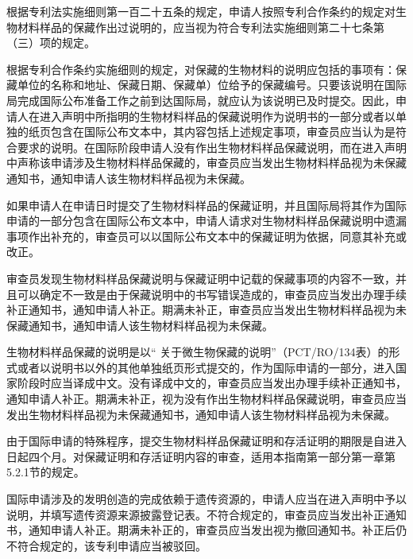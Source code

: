 根据专利法实施细则第一百二十五条的规定，申请人按照专利合作条约的规定对生物材料样品的保藏作出过说明的，应当视为符合专利法实施细则第二十七条第（三）项的规定。

根据专利合作条约实施细则的规定，对保藏的生物材料的说明应包括的事项有：保藏单位的名称和地址、保藏日期、保藏单{\kaiti ）}位给予的保藏编号。只要该说明在国际局完成国际公布准备工作之前到达国际局，就应认为该说明已及时提交。因此，申请人在进入声明中所指明的生物材料样品的保藏说明作为说明书的一部分或者以单独的纸页包含在国际公布文本中，其内容包括上述规定事项，审查员应当认为是符合要求的说明。在国际阶段申请人没有作出生物材料样品保藏说明，而在进入声明中声称该申请涉及生物材料样品保藏的，审查员应当发出生物材料样品视为未保藏通知书，通知申请人该生物材料样品视为未保藏。

如果申请人在申请日时提交了生物材料样品的保藏证明，并且国际局将其作为国际申请的一部分包含在国际公布文本中，申请人请求对生物材料样品保藏说明中遗漏事项作出补充的，审查员可以以国际公布文本中的保藏证明为依据，同意其补充或改正。

审查员发现生物材料样品保藏说明与保藏证明中记载的保藏事项的内容不一致，并且可以确定不一致是由于保藏说明中的书写错误造成的，审查员应当发出办理手续补正通知书，通知申请人补正。期满未补正，审查员应当发出生物材料样品视为未保藏通知书，通知申请人该生物材料样品视为未保藏。

生物材料样品保藏的说明是以“ 关于微生物保藏的说明”（PCT/RO/134表）的形式或者以说明书以外的其他单独纸页形式提交的，作为国际申请的一部分，进入国家阶段时应当译成中文。没有译成中文的，审查员应当发出办理手续补正通知书，通知申请人补正。期满未补正，视为没有作出生物材料样品保藏说明，审查员应当发出生物材料样品视为未保藏通知书，通知申请人该生物材料样品视为未保藏。

由于国际申请的特殊程序，提交生物材料样品保藏证明和存活证明的期限是自进入日起四个月。对保藏证明和存活证明内容的审查，适用本指南第一部分第一章第5.2.1节的规定。

国际申请涉及的发明创造的完成依赖于遗传资源的，申请人应当在进入声明中予以说明，并填写遗传资源来源披露登记表。不符合规定的，审查员应当发出补正通知书，通知申请人补正。期满未补正的，审查员应当发出视为撤回通知书。补正后仍不符合规定的，该专利申请应当被驳回。

